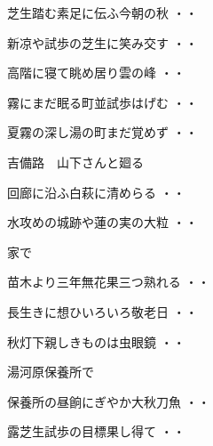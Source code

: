\begin{shiika}芝生踏む素足に伝ふ今朝の秋
\hfill{・・}\end{shiika}
\vspace{0.6cm}
\begin{shiika}新凉や試歩の芝生に笑み交す
\hfill{・・}\end{shiika}
\vspace{0.6cm}
\begin{shiika}高階に寝て眺め居り雲の峰
\hfill{・・}\end{shiika}
\vspace{0.6cm}
\begin{shiika}霧にまだ眠る町並試歩はげむ
\hfill{・・}\end{shiika}
\vspace{0.6cm}
\begin{shiika}夏霧の深し湯の町まだ覚めず
\hfill{・・}\end{shiika}
\vspace{0.6cm}
吉備路　山下さんと廻る
\begin{shiika}回廊に沿ふ白萩に清めらる
\hfill{・・}\end{shiika}
\begin{shiika}水攻めの城跡や蓮の実の大粒
\hfill{・・}\end{shiika}
\vspace{0.6cm}
家で
\begin{shiika}苗木より三年無花果三つ熟れる
\hfill{・・}\end{shiika}
\begin{shiika}長生きに想ひいろいろ敬老日
\hfill{・・}\end{shiika}
\begin{shiika}秋灯下親しきものは虫眼鏡
\hfill{・・}\end{shiika}
\vspace{0.6cm}
湯河原保養所で
\begin{shiika}保養所の昼餉にぎやか大秋刀魚
\hfill{・・}\end{shiika}
\begin{shiika}露芝生試歩の目標果し得て
\hfill{・・}\end{shiika}

